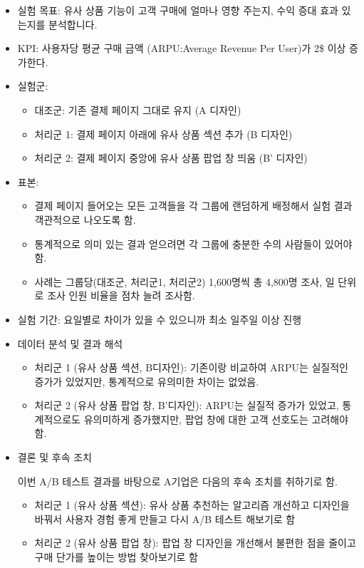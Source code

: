 \documentclass[
  letterpaper,
]{book}
\providecommand{\tightlist}{%
  \setlength{\itemsep}{0pt}\setlength{\parskip}{0pt}}\usepackage{longtable,booktabs,array}
\begin{document}
\begin{itemize}
\item
  실험 목표: 유사 상품 기능이 고객 구매에 얼마나 영향 주는지, 수익 증대
  효과 있는지를 분석합니다.
\item
  KPI: 사용자당 평균 구매 금액 (ARPU:Average Revenue Per User)가 2\$
  이상 증가한다.
\item
  실험군:

  \begin{itemize}
  \tightlist
  \item
    대조군: 기존 결제 페이지 그대로 유지 (A 디자인)
  \item
    처리군 1: 결제 페이지 아래에 유사 상품 섹션 추가 (B 디자인)
  \item
    처리군 2: 결제 페이지 중앙에 유사 상품 팝업 창 띄움 (B' 디자인)
  \end{itemize}
\item
  표본:

  \begin{itemize}
  \tightlist
  \item
    결제 페이지 들어오는 모든 고객들을 각 그룹에 랜덤하게 배정해서 실험
    결과 객관적으로 나오도록 함.
  \item
    통계적으로 의미 있는 결과 얻으려면 각 그룹에 충분한 수의 사람들이
    있어야 함.
  \item
    사례는 그룹당(대조군, 처리군1, 처리군2) 1,600명씩 총 4,800명 조사,
    일 단위로 조사 인원 비율을 점차 늘려 조사함.
  \end{itemize}
\item
  실험 기간: 요일별로 차이가 있을 수 있으니까 최소 일주일 이상 진행
\item
  데이터 분석 및 결과 해석

  \begin{itemize}
  \tightlist
  \item
    처리군 1 (유사 상품 섹션, B디자인): 기존이랑 비교하여 ARPU는
    실질적인 증가가 있었지만, 통계적으로 유의미한 차이는 없었음.
  \item
    처리군 2 (유사 상품 팝업 창, B'디자인): ARPU는 실질적 증가가 있었고,
    통계적으로도 유의미하게 증가했지만, 팝업 창에 대한 고객 선호도는
    고려해야함.
  \end{itemize}
\item
  결론 및 후속 조치

  이번 A/B 테스트 결과를 바탕으로 A기업은 다음의 후속 조치를 취하기로
  함.

  \begin{itemize}
  \tightlist
  \item
    처리군 1 (유사 상품 섹션): 유사 상품 추천하는 알고리즘 개선하고
    디자인을 바꿔서 사용자 경험 좋게 만들고 다시 A/B 테스트 해보기로 함
  \item
    처리군 2 (유사 상품 팝업 창): 팝업 창 디자인을 개선해서 불편한 점을
    줄이고 구매 단가를 높이는 방법 찾아보기로 함
  \end{itemize}
\end{itemize}
\end{document}
